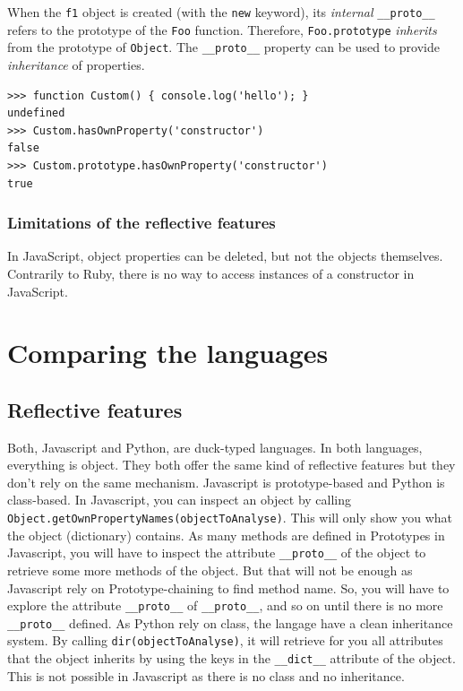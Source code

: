 \documentclass[a4paper,10pt]{article}
\begin{document}
When the \lstinline|f1| object is created (with the \lstinline|new| keyword), its \textit{internal} \lstinline|__proto__| refers to the prototype of the \lstinline|Foo| function.
Therefore, \lstinline|Foo.prototype| \textit{inherits} from the prototype of \lstinline|Object|.
The \lstinline|__proto__| property can be used to provide \textit{inheritance} of properties.

\begin{lstlisting}
>>> function Custom() { console.log('hello'); }
undefined
>>> Custom.hasOwnProperty('constructor')
false
>>> Custom.prototype.hasOwnProperty('constructor')
true
\end{lstlisting}


\subsubsection{Limitations of the reflective features}

In JavaScript, object properties can be deleted, but not the objects themselves.
Contrarily to Ruby, there is no way to access instances of a constructor in JavaScript.




\newpage
\section{Comparing the languages}

\subsection{Reflective features}

Both, Javascript and Python, are duck-typed languages. In both languages, everything is object. They both offer the same kind of reflective features but they don't rely on the same mechanism. Javascript is prototype-based and Python is class-based. In Javascript, you can inspect an object by calling \setjs \lstinline|Object.getOwnPropertyNames(objectToAnalyse)|. This will only show you what the object (dictionary) contains. As many methods are defined in Prototypes in Javascript, you will have to inspect the attribute \lstinline|__proto__| of the object to retrieve some more methods of the object. But that will not be enough as Javascript rely on Prototype-chaining to find method name. So, you will have to explore the attribute \lstinline|__proto__| of \lstinline|__proto__|, and so on until there is no more \lstinline|__proto__| defined. \setpy As Python rely on class, the langage have a clean inheritance system. By calling \lstinline|dir(objectToAnalyse)|, it will retrieve for you all attributes that the object inherits by using the keys in the \lstinline|__dict__| attribute of the object. This is not possible in Javascript as there is no class and no inheritance.  
\end{document}
